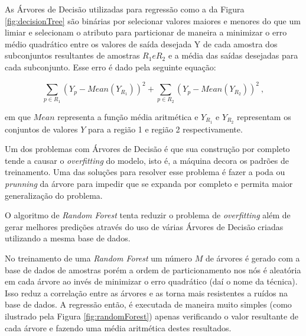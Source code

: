 \documentclass[12pt]{article}
\begin{document}
            As Árvores de Decisão utilizadas para regressão como a da Figura \ref{fig:decisionTree} são binárias por selecionar valores maiores e menores do que um limiar e selecionam o atributo para particionar de maneira a minimizar o erro médio quadrático entre os valores de saída desejada Y de cada amostra dos subconjuntos resultantes de amostras $R_1 e R_2$ e a média das saídas desejadas para cada subconjunto. Esse erro é dado pela seguinte equação:
            
            \begin{equation} 
            \label{eq:decisionTreeMinimize}
            \sum_{p \in R_1}{(Y_p - Mean(Y_{R_1}))^2} +
            \sum_{p \in R_2}{(Y_p - Mean(Y_{R_2}))^2}~,
            \end{equation}
            
            \noindent em que $Mean$ representa a função média aritmética e $Y_{R_1}$ e $Y_{R_2}$ representam os conjuntos de valores $Y$ para a região 1 e região 2 respectivamente. 
            
            Um dos problemas com Árvores de Decisão é que sua construção por completo tende a causar o \textit{overfitting} do modelo, isto é, a máquina decora os padrões de treinamento. Uma das soluções para resolver esse problema é fazer a poda ou \textit{prunning} da árvore para impedir que se expanda por completo e permita maior generalização do problema. 
            
            O algoritmo de \textit{Random Forest} tenta reduzir o problema de \textit{overfitting} além de gerar melhores predições através do uso de várias Árvores de Decisão criadas utilizando a mesma base de dados.
            
            No treinamento de uma \textit{Random Forest} um número $M$ de árvores é gerado com a base de dados de amostras porém a ordem de particionamento nos nós é aleatória em cada árvore ao invés de minimizar o erro quadrático (daí o nome da técnica). Isso reduz a correlação entre as árvores e as torna mais resistentes a ruídos na base de dados. A regressão então, é executada de maneira muito simples (como ilustrado pela Figura \ref{fig:randomForest}) apenas verificando o valor resultante de cada árvore e fazendo uma média aritmética destes resultados.
\end{document}
